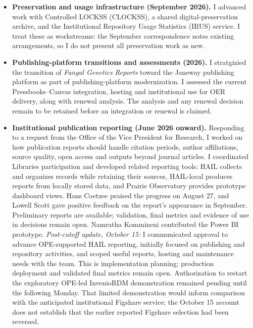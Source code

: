 \begin{itemize}
\item \textbf{Preservation and usage infrastructure (September 2026).} I advanced work with Controlled LOCKSS (CLOCKSS), a shared digital-preservation archive, and the Institutional Repository Usage Statistics (IRUS) service. I treat these as workstreams: the September correspondence notes existing arrangements, so I do not present all preservation work as new.
\item \textbf{Publishing-platform transitions and assessments (2026).} I stratgizied the transition of \textit{Fungal Genetics Reports} toward the Janeway publishing platform as part of publishing-platform modernization. I assessed the current Pressbooks--Canvas integration, hosting and institutional use for OER delivery, along with renewal analysis. The analysis and any renewal decision remain to be retained before an integration or renewal is claimed.
\item \textbf{Institutional publication reporting (June 2026 onward).}\label{update-hail} Responding to a request from the Office of the Vice President for Research, I worked on how publication reports should handle citation periods, author affiliations, source quality, open access and outputs beyond journal articles. I coordinated Libraries participation and developed related reporting tools: HAIL collects and organizes records while retaining their sources, HAIL-local produces reports from locally stored data, and Prairie Observatory provides prototype dashboard views. Hans Coetzee praised the progress on August 27, and Lowell Scott gave positive feedback on the report's appearance in September. Preliminary reports are available; validation, final metrics and evidence of use in decisions remain open. Namratha Kommineni contributed the Power BI prototype. \textit{Post-cutoff update, October 15:} I communicated approval to advance OPE-supported HAIL reporting, initially focused on publishing and repository activities, and scoped useful reports, hosting and maintenance needs with the team. This is implementation planning; production deployment and validated final metrics remain open. Authorization to restart the exploratory OPE-led InvenioRDM demonstration remained pending until the following Monday. That limited demonstration would inform comparison with the anticipated institutional Figshare service; the October 15 account does not establish that the earlier reported Figshare selection had been reversed.

\end{itemize}
